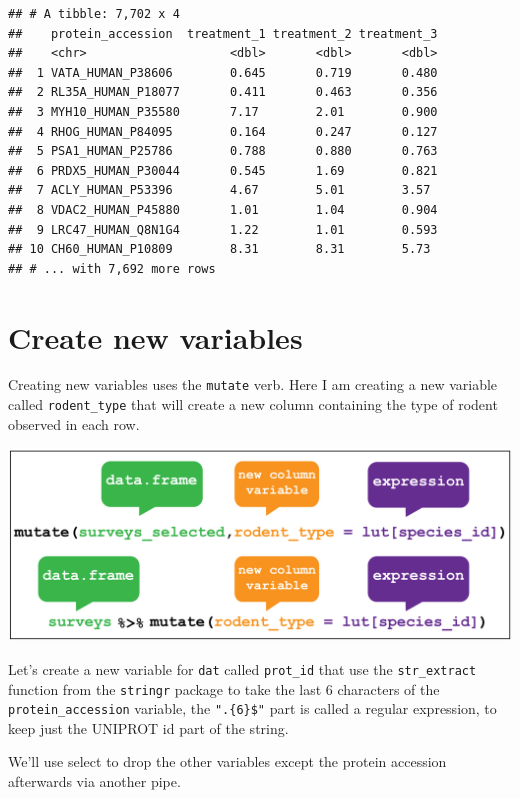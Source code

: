 \documentclass[12pt,]{book}
\newenvironment{Shaded}{\begin{snugshade}}{\end{snugshade}}
\newcommand{\DataTypeTok}[1]{\textcolor[rgb]{0.13,0.29,0.53}{#1}}
\newcommand{\KeywordTok}[1]{\textcolor[rgb]{0.13,0.29,0.53}{\textbf{#1}}}
\newcommand{\NormalTok}[1]{#1}
\newcommand{\OperatorTok}[1]{\textcolor[rgb]{0.81,0.36,0.00}{\textbf{#1}}}
\newcommand{\StringTok}[1]{\textcolor[rgb]{0.31,0.60,0.02}{#1}}
\begin{document}
\begin{verbatim}
## # A tibble: 7,702 x 4
##    protein_accession  treatment_1 treatment_2 treatment_3
##    <chr>                    <dbl>       <dbl>       <dbl>
##  1 VATA_HUMAN_P38606        0.645       0.719       0.480
##  2 RL35A_HUMAN_P18077       0.411       0.463       0.356
##  3 MYH10_HUMAN_P35580       7.17        2.01        0.900
##  4 RHOG_HUMAN_P84095        0.164       0.247       0.127
##  5 PSA1_HUMAN_P25786        0.788       0.880       0.763
##  6 PRDX5_HUMAN_P30044       0.545       1.69        0.821
##  7 ACLY_HUMAN_P53396        4.67        5.01        3.57 
##  8 VDAC2_HUMAN_P45880       1.01        1.04        0.904
##  9 LRC47_HUMAN_Q8N1G4       1.22        1.01        0.593
## 10 CH60_HUMAN_P10809        8.31        8.31        5.73 
## # ... with 7,692 more rows
\end{verbatim}

\hypertarget{mutate}{%
\section{Create new variables}\label{mutate}}

Creating new variables uses the \texttt{mutate} verb. Here I am creating a new
variable called \texttt{rodent\_type} that will create a new column containing the type
of rodent observed in each row.

\begin{center}\includegraphics[width=0.8\linewidth]{img/dplyr_mutate} \end{center}

Let's create a new variable for \texttt{dat} called \texttt{prot\_id} that use the \texttt{str\_extract}
function from the \texttt{stringr} package to take the last 6 characters of
the \texttt{protein\_accession} variable, the \texttt{".\{6\}\$"} part is called a regular
expression, to keep just the UNIPROT id part of the string.

We'll use select to drop the other variables except the
protein accession afterwards via another pipe.

\begin{Shaded}
\end{Shaded}
\end{document}
